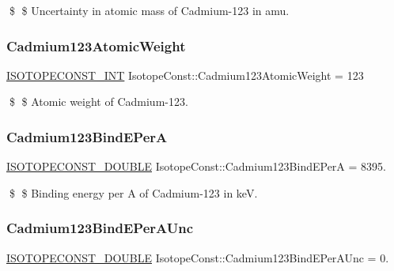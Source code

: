 \$ \$ Uncertainty in atomic mass of Cadmium-\/123 in amu. \mbox{\label{group___isotope_const-_cadmium-_cd123_ga30479b53035199a802d0f339c047764f}} 
\subsubsection{\texorpdfstring{Cadmium123\+Atomic\+Weight}{Cadmium123AtomicWeight}}
{\footnotesize\ttfamily \mbox{\hyperlink{group___isotope_const-_macros_ga5f18360b3e99483a35c32d789e62621c}{I\+S\+O\+T\+O\+P\+E\+C\+O\+N\+S\+T\+\_\+\+I\+NT}} Isotope\+Const\+::\+Cadmium123\+Atomic\+Weight = 123}

\$ \$ Atomic weight of Cadmium-\/123. \mbox{\label{group___isotope_const-_cadmium-_cd123_gac289db3f0b5862894354a5a6efd6e20f}} 
\subsubsection{\texorpdfstring{Cadmium123\+Bind\+E\+PerA}{Cadmium123BindEPerA}}
{\footnotesize\ttfamily \mbox{\hyperlink{group___isotope_const-_macros_ga8f45a7272ce02c0b4c65c44636ed719a}{I\+S\+O\+T\+O\+P\+E\+C\+O\+N\+S\+T\+\_\+\+D\+O\+U\+B\+LE}} Isotope\+Const\+::\+Cadmium123\+Bind\+E\+PerA = 8395.}

\$ \$ Binding energy per A of Cadmium-\/123 in keV. \mbox{\label{group___isotope_const-_cadmium-_cd123_gae94b338171f0a0257fc1f898e06124f4}} 
\subsubsection{\texorpdfstring{Cadmium123\+Bind\+E\+Per\+A\+Unc}{Cadmium123BindEPerAUnc}}
{\footnotesize\ttfamily \mbox{\hyperlink{group___isotope_const-_macros_ga8f45a7272ce02c0b4c65c44636ed719a}{I\+S\+O\+T\+O\+P\+E\+C\+O\+N\+S\+T\+\_\+\+D\+O\+U\+B\+LE}} Isotope\+Const\+::\+Cadmium123\+Bind\+E\+Per\+A\+Unc = 0.}

